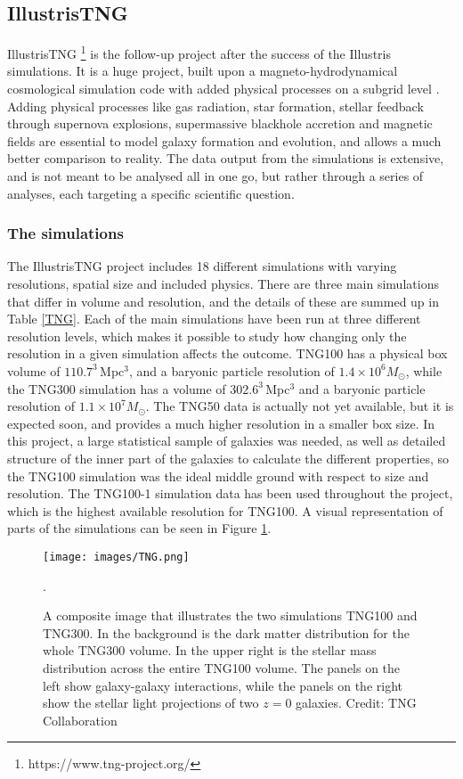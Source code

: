 \subsection{IllustrisTNG}
IllustrisTNG \footnote{https://www.tng-project.org/} is the follow-up project after the success of the Illustris simulations. It is a huge project, built upon a magneto-hydrodynamical cosmological simulation code with added physical processes on a subgrid level \parencite{Weinberger2016}. Adding physical processes like gas radiation, star formation, stellar feedback through supernova explosions, supermassive blackhole accretion and magnetic fields are essential to model galaxy formation and evolution, and allows a much better comparison to reality. The data output from the simulations is extensive, and is not meant to be analysed all in one go, but rather through a series of analyses, each targeting a specific scientific question. 


\subsubsection{The simulations}
The IllustrisTNG project includes 18 different simulations with varying resolutions, spatial size and included physics. There are three main simulations that differ in volume and resolution, and the details of these are summed up in Table \ref{TNG}. Each of the main simulations have been run at three different resolution levels, which makes it possible to study how changing only the resolution in a given simulation affects the outcome. TNG100 has a physical box volume of $110.7^3 \, $Mpc$^3$, and a baryonic particle resolution of $1.4 \times 10^6 M_{\odot}$, while the TNG300 simulation has a volume of $302.6^3 \, $Mpc$^3$ and a baryonic particle resolution of $1.1 \times 10^7 M_{\odot}$. The TNG50 data is actually not yet available, but it is expected soon, and provides a much higher resolution in a smaller box size. In this project, a large statistical sample of galaxies was needed, as well as detailed structure of the inner part of the galaxies to calculate the different properties, so the TNG100 simulation was the ideal middle ground with respect to size and resolution. The TNG100-1 simulation data has been used throughout the project, which is the highest available resolution for TNG100. A visual representation of parts of the simulations can be seen in Figure \ref{tng_illustration}.

\begin{figure}
    \centering
    \texttt{[image: images/TNG.png]}
    \caption{A composite image that illustrates the two simulations TNG100 and TNG300. In the background is the dark matter distribution for the whole TNG300 volume. In the upper right is the stellar mass distribution across the entire TNG100 volume. The panels on the left show galaxy-galaxy interactions, while the panels on the right show the stellar light projections of two $z=0$ galaxies. Credit: TNG Collaboration}.
    \label{tng_illustration}
\end{figure}


